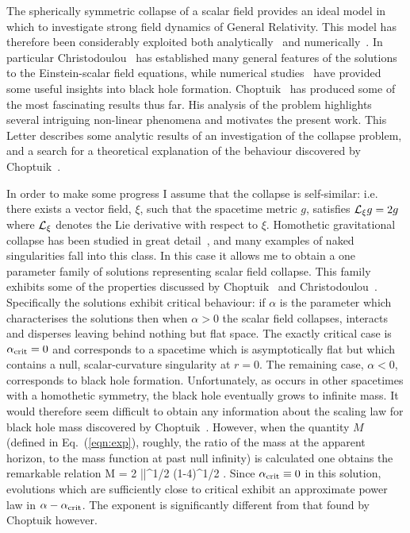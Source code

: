 The spherically symmetric collapse of a scalar field provides an ideal model in
which to investigate strong field dynamics of General Relativity.  This model
has therefore been considerably exploited both analytically~\cite{ref:1} and
numerically~\cite{ref:2,ref:3}.  In particular Christodoulou~\cite{ref:1} has
established many
general features of the solutions to the Einstein-scalar field equations, while
numerical studies~\cite{ref:2,ref:3} have provided some useful
insights into black hole formation.  Choptuik~\cite{ref:3} has produced some of
the
most fascinating results thus far.  His analysis of the problem highlights
several intriguing non-linear phenomena and motivates the present work.  This
Letter describes some analytic results of an investigation of the
collapse problem, and a search for a theoretical explanation of the behaviour
discovered by Choptuik~\cite{ref:3}.

In order to make some progress I assume that the collapse is self-similar: i.e.
there exists a vector field, $\xi$, such that the spacetime metric $g$,
satisfies ${\cal
L}_{\xi} g = 2 g$ where $\cal L_{\xi}$ denotes the Lie derivative with respect
to $\xi$.  Homothetic gravitational collapse has been studied in great
detail~\cite{ref:4},  and many examples of naked singularities fall into
this class.  In this case it allows me to obtain a one parameter family of
solutions representing scalar field collapse.
This family exhibits some of the properties discussed by
Choptuik~\cite{ref:3} and Christodoulou~\cite{ref:1}.  Specifically the
solutions exhibit  critical
behaviour:  if $\alpha$ is the parameter which characterises the solutions then
when $\alpha > 0$ the scalar field collapses, interacts and disperses leaving
behind nothing but flat space.  The exactly critical case is $\alpha_{\rm crit}
= 0$ and corresponds to a spacetime which is asymptotically flat but which
contains a null, scalar-curvature singularity at $r=0$.  The remaining case,
$\alpha < 0$, corresponds to black hole formation.  Unfortunately, as occurs
in other spacetimes with a homothetic symmetry, the black hole eventually grows
to infinite mass.  It would therefore seem difficult to obtain any information
about
the scaling law for black hole mass discovered by Choptuik~\cite{ref:3}.
However, when the quantity $M$ (defined in Eq.~(\ref{eqn:exp}), roughly, the
ratio of
the mass at the apparent horizon, to the mass function at past null infinity)
is calculated one obtains the remarkable relation
	\be
	M = 2 |\alpha|^{1/2} (1-4\alpha)^{1/2}\: .
	\ee
Since $\alpha_{\rm crit} \equiv 0$ in this solution,  evolutions which are
sufficiently close to critical exhibit an approximate power law in $\alpha -
\alpha_{\rm crit}$.  The exponent is significantly different from that found
by Choptuik however.

